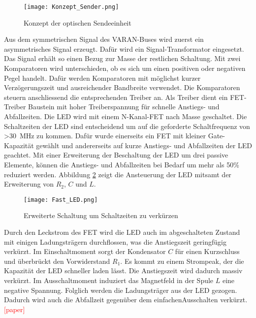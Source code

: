 \begin{figure}[H]
	\centering
	\texttt{[image: Konzept\_Sender.png]}
	\caption{Konzept der optischen Sendeeinheit}\label{fig:Konzept_Sender}
\end{figure}

Aus dem symmetrischen Signal des VARAN-Buses wird zuerst ein asymmetrisches Signal erzeugt. Dafür wird ein Signal-Transformator eingesetzt. Das Signal erhält so einen Bezug zur Masse der restlichen Schaltung. Mit zwei Komparatoren wird unterschieden, ob es sich um einen positiven oder negativen Pegel handelt. Dafür werden Komparatoren mit möglichst kurzer Verzögerungszeit und ausreichender Bandbreite verwendet. Die Komparatoren steuern anschliessend die entsprechenden Treiber an. 
\newline
Als Treiber dient ein FET-Treiber Baustein mit hoher Treiberspannung für schnelle Anstiegs- und Abfallzeiten. Die LED wird mit einem N-Kanal-FET nach Masse geschaltet. Die Schaltzeiten der LED sind entscheidend um auf die geforderte Schaltfrequenz von \textgreater \SI{30}{MHz} zu kommen. Dafür wurde einerseits ein FET mit kleiner Gate-Kapazität gewählt und andererseits auf kurze Anstiegs- und Abfallzeiten der LED geachtet.
\newline
Mit einer Erweiterung der Beschaltung der LED um drei passive Elemente, können die Anstiegs- und Abfallzeiten bei Bedarf um mehr als 50\% reduziert werden. Abbildung \ref{fig:Fast_LED} zeigt die Ansteuerung der LED mitsamt der Erweiterung von $R_{2}$, $C$ und $L$.

 \begin{figure}[h]
 	\centering
 	\texttt{[image: Fast\_LED.png]}
 	\caption{Erweiterte Schaltung um Schaltzeiten zu verkürzen}\label{fig:Fast_LED}
 \end{figure}

Durch den Leckstrom des FET wird die LED auch im abgeschalteten Zustand mit einigen Ladungsträgern durchflossen, was die Anstiegszeit geringfügig verkürzt. Im Einschaltmoment sorgt der Kondensator $C$ für einen Kurzschluss und überbrückt den Vorwiderstand $R_{1}$. Es kommt zu einem Strompeak, der die Kapazität der LED schneller laden lässt. Die Anstiegszeit wird dadurch massiv verkürzt. Im Ausschaltmoment induziert das Magnetfeld in der Spule $L$ eine negative Spannung. Folglich werden die Ladungsträger aus der LED gezogen. Dadurch wird auch die Abfallzeit gegenüber dem \glqq einfachen\grqq Ausschalten verkürzt.\textcolor{red}{[paper]}

\newpage
